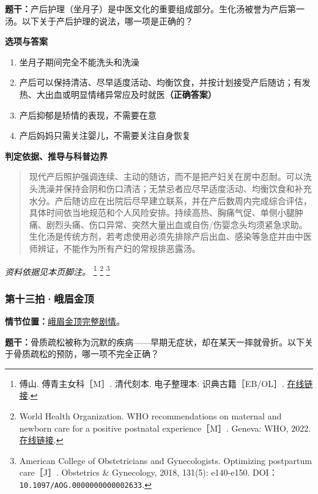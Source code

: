 \textbf{题干：}产后护理（坐月子）是中医文化的重要组成部分。生化汤被誉为产后第一汤。以下关于产后护理的说法，哪一项是正确的？

\textbf{选项与答案}
\begin{enumerate}[label=\Alph*.,leftmargin=*]
  \item 坐月子期间完全不能洗头和洗澡
  \item 产后可以保持清洁、尽早适度活动、均衡饮食，并按计划接受产后随访；有发热、大出血或明显情绪异常应及时就医\textbf{（正确答案）}
  \item 产后抑郁是矫情的表现，不需要在意
  \item 产后妈妈只需关注婴儿，不需要关注自身恢复
\end{enumerate}
\textbf{判定依据、推导与科普边界}
\begin{quote}现代产后照护强调连续、主动的随访，而不是把产妇关在房中忍耐。可以洗头洗澡并保持会阴和伤口清洁；无禁忌者应尽早适度活动、均衡饮食和补充水分。产后随访应在出院后尽早建立联系，并在产后数周内完成综合评估，具体时间依当地规范和个人风险安排。持续高热、胸痛气促、单侧小腿肿痛、剧烈头痛、伤口异常、突然大量出血或自伤/伤婴念头均须紧急求助。生化汤是传统方剂，若考虑使用必须先排除产后出血、感染等急症并由中医师辨证，不能作为所有产妇的常规排恶露汤。\end{quote}
\noindent\textit{资料依据见本页脚注。}
\footnote{傅山. 傅青主女科［M］. 清代刻本. 电子整理本: 识典古籍［EB/OL］. \href{https://www.shidianguji.com/book/YCM294300096/chapter/1l9ggh6dkjmer}{在线链接}.}
\footnote{World Health Organization. WHO recommendations on maternal and newborn care for a positive postnatal experience［M］. Geneva: WHO, 2022. \href{https://www.who.int/publications/i/item/9789240045989}{在线链接}.}
\footnote{American College of Obstetricians and Gynecologists. Optimizing postpartum care［J］. Obstetrics \& Gynecology, 2018, 131(5): e140-e150. DOI：\nolinkurl{10.1097/AOG.0000000000002633}.}

\subsubsection{第十三拍·峨眉金顶}\label{question:zhouzhiruo:13}
\textbf{情节位置：}\hyperref[plot:zhouzhiruo:13]{峨眉金顶完整剧情}。

\textbf{题干：}骨质疏松被称为沉默的疾病——早期无症状，却在某天一摔就骨折。以下关于骨质疏松的预防，哪一项不完全正确？

